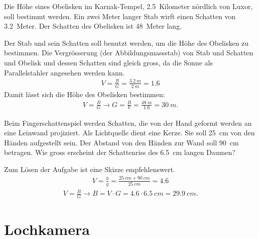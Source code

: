 \documentclass[paper=a4,twoside=true,,DIV13,BCOR1cm]{scrartcl}
\begin{document}
\begin{aufgabe}
	Die Höhe eines Obelisken im Karnak-Tempel, \SI{2,5}{Kilometer} nördlich von Luxor, soll bestimmt werden.
	Ein zwei Meter langer Stab wirft einen Schatten von \SI{3,2}{Meter}. Der Schatten des Obelisken ist \SI{48}{Meter} lang.

	
	\begin{loesung}
		Der Stab und sein Schatten soll benutzt werden, um die Höhe des Obelisken zu bestimmen. Die Vergrösserung (der Abbildungsmassstab)
		von Stab und Schatten und Obelisk und dessen Schatten sind gleich gross, da die Sonne als Parallelstahler angesehen werden kann.
		\begin{eqnarray*}
			V=\frac{B}{G}=\frac{\SI{3.2}{m}}{\SI{2}{m}} = \num{1.6}
		\end{eqnarray*}
		Damit lässt sich die Höhe des Obelisken bestimmen:
		\begin{eqnarray*}
			V=\frac{B}{G}\to G=\frac{B}{V}=\frac{\SI{48}{m}}{\num{1.6}}=\SI{30}{m}\text{.}
		\end{eqnarray*}
	\end{loesung}
\end{aufgabe}

\begin{aufgabe}
	Beim Fingerschattenspiel werden Schatten, die von der Hand geformt werden an eine Leinwand projiziert.
	Als Lichtquelle dient eine Kerze. Sie soll \SI{25}{cm} von den Händen aufgestellt sein. Der Abstand von
	den Händen zur Wand soll \SI{90}{cm} betragen. Wie gross erscheint der Schattenriss des \SI{6.5}{cm} langen Daumen?


	\begin{loesung}
		Zum Lösen der Aufgabe ist eine Skizze empfehlenswert.
		\begin{eqnarray*}
			V=\frac{b}{g}=\frac{\SI{25}{cm} + \SI{90}{cm}}{\SI{25}{cm}}=\num{4.6}
		\end{eqnarray*}
		\begin{eqnarray*}
			V=\frac{B}{G}\to B=V\cdot G = \num{4.6}\cdot\SI{6.5}{cm}=\SI{29.9}{cm}\text{.}
		\end{eqnarray*}
	\end{loesung}
\end{aufgabe}


\section{Lochkamera}
\end{document}
